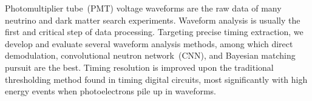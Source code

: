 Photomultiplier tube~(PMT) voltage waveforms are the raw data of many neutrino and dark matter search experiments.  Waveform analysis is usually the first and critical step of data processing.  Targeting precise timing extraction, we develop and evaluate several waveform analysis methods, among which direct demodulation, convolutional neutron network~(CNN), and Bayesian matching pursuit are the best.  Timing resolution is improved upon the traditional thresholding method found in timing digital circuits, most significantly with high energy events when photoelectrons pile up in waveforms. 